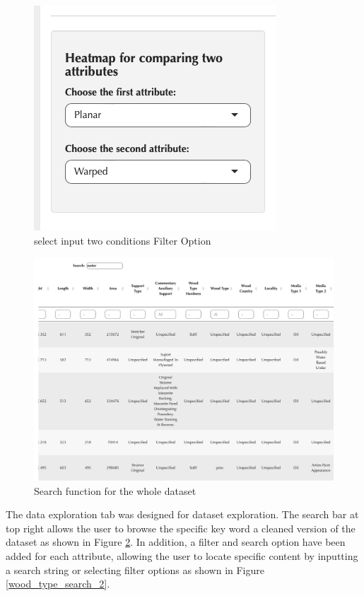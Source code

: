 \documentclass[11pt, oneside]{article}
\begin{document}
\begin{figure}[H]
    \centering
\includegraphics[scale=0.6]{images/two_con_filter.png}
    \caption{select input two conditions Filter Option}
    \label{two_con_filter_2}
\end{figure}
\newpage
\begin{figure}[H]
    \centering
\includegraphics[scale=0.35]{images/seach_top_data.png}
    \caption{Search function for the whole dataset}
    \label{seach_top_data_2}
\end{figure}

\noindent The data exploration tab was designed for dataset exploration. The search bar at top right allows the user to browse the specific key word a cleaned version of the dataset as shown in Figure \ref{seach_top_data_2}. In addition, a filter and search option have been added for each attribute, allowing the user to locate specific content by inputting a search string or selecting filter options as shown in Figure \ref{wood_type_search_2}.
\end{document}
